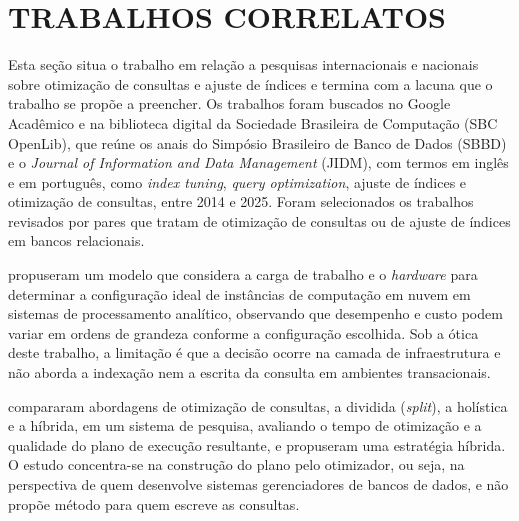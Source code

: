 
\section{TRABALHOS CORRELATOS}\label{sec:correlatos}

Esta seção situa o trabalho em relação a pesquisas internacionais e nacionais sobre otimização de consultas e ajuste de índices e termina com a lacuna que o trabalho se propõe a preencher. Os trabalhos foram buscados no Google Acadêmico e na biblioteca digital da Sociedade Brasileira de Computação (SBC OpenLib), que reúne os anais do Simpósio Brasileiro de Banco de Dados (SBBD) e o \textit{Journal of Information and Data Management} (JIDM), com termos em inglês e em português, como \textit{index tuning}, \textit{query optimization}, ajuste de índices e otimização de consultas, entre 2014 e 2025. Foram selecionados os trabalhos revisados por pares que tratam de otimização de consultas ou de ajuste de índices em bancos relacionais. 

 propuseram um modelo que considera a carga de trabalho e o \textit{hardware} para determinar a configuração ideal de instâncias de computação em nuvem em sistemas de processamento analítico, observando que desempenho e custo podem variar em ordens de grandeza conforme a configuração escolhida. Sob a ótica deste trabalho, a limitação é que a decisão ocorre na camada de infraestrutura e não aborda a indexação nem a escrita da consulta em ambientes transacionais.

 compararam abordagens de otimização de consultas, a dividida (\textit{split}), a holística e a híbrida, em um sistema de pesquisa, avaliando o tempo de otimização e a qualidade do plano de execução resultante, e propuseram uma estratégia híbrida. O estudo concentra-se na construção do plano pelo otimizador, ou seja, na perspectiva de quem desenvolve sistemas gerenciadores de bancos de dados, e não propõe método para quem escreve as consultas.

